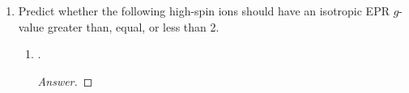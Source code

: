 \documentclass[../psets.tex]{subfiles}
\begin{document}
\begin{enumerate}
\begin{enumerate}
\begin{proof}[Answer]
\begin{align*}
                \mu_\text{eff} &= \sqrt{4\left( \frac{2}{2}\left( \frac{2}{2}+1 \right) \right)}&
                    \chi T &= \frac{1}{2}\left( \frac{2}{2}\left( \frac{2}{2}+1 \right) \right)\\
                \Aboxed{\mu_\text{eff} &= 2.82}&
                    \Aboxed{\chi T &= 1}
            \end{align*}
        \end{proof}
        \item Tetrahedral .
        \begin{proof}[Answer]
            High spin.
            As a first-row transition metal with $T_d$ geometry,  will be  It follows that as a $d^6$ metal center,  will have 4 unpaired electrons. Thus,
            \begin{align*}
                \mu_\text{eff} &= \sqrt{4\left( \frac{4}{2}\left( \frac{4}{2}+1 \right) \right)}&
                    \chi T &= \frac{1}{2}\left( \frac{4}{2}\left( \frac{4}{2}+1 \right) \right)\\
                \Aboxed{\mu_\text{eff} &= 4.90}&
                    \Aboxed{\chi T &= 3}
            \end{align*}
        \end{proof}
    \end{enumerate}
    \item Predict whether the following high-spin ions should have an isotropic EPR $g$-value greater than, equal, or less than 2.
    \begin{enumerate}
        \item {}.
        \begin{proof}[Answer]



\end{proof}
\end{enumerate}
\end{enumerate}
\end{document}
